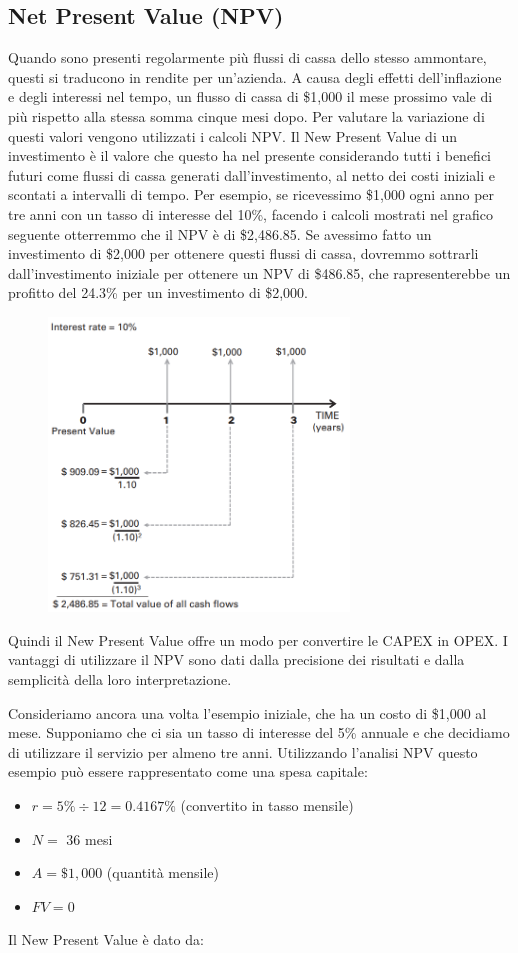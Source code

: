 \subsection{Net Present Value (NPV)}
Quando sono presenti regolarmente più flussi di cassa dello stesso ammontare, questi si traducono in rendite per un'azienda. A causa degli effetti dell'inflazione e degli interessi nel tempo, un flusso di cassa di \$1,000 il mese prossimo vale di più rispetto alla stessa somma cinque mesi dopo. Per valutare la variazione di questi valori vengono utilizzati i calcoli NPV. Il New Present Value di un investimento è il valore che questo ha nel presente considerando tutti i benefici futuri come flussi di cassa generati dall'investimento, al netto dei costi iniziali e scontati a intervalli di tempo. Per esempio, se ricevessimo \$1,000 ogni anno per tre anni con un tasso di interesse del 10\%, facendo i calcoli mostrati nel grafico seguente otterremmo che il NPV è di \$2,486.85. Se avessimo fatto un investimento di \$2,000 per ottenere questi flussi di cassa, dovremmo sottrarli dall'investimento iniziale per ottenere un NPV di \$486.85, che rapresenterebbe un profitto del 24.3\% per un investimento di \$2,000.

\begin{figure}[htb!]
    \centering
    \includegraphics[width=8cm]{./Images/cap6/6.11.png}
\end{figure}

Quindi il New Present Value offre un modo per convertire le CAPEX in OPEX. I vantaggi di utilizzare il NPV sono dati dalla precisione dei risultati e dalla semplicità della loro interpretazione.

Consideriamo ancora una volta l'esempio iniziale, che ha un costo di \$1,000 al mese. Supponiamo che ci sia un tasso di interesse del 5\% annuale e che decidiamo di utilizzare il servizio per almeno tre anni. Utilizzando l'analisi NPV questo esempio può essere rappresentato come una spesa capitale:
\begin{itemize}
    \item $r = 5\% \div 12 = 0.4167\%$ (convertito in tasso mensile)
    \item $N = $ 36 mesi
    \item $A = \$1,000$ (quantità mensile)
    \item $FV = 0$
\end{itemize}
Il New Present Value è dato da:


